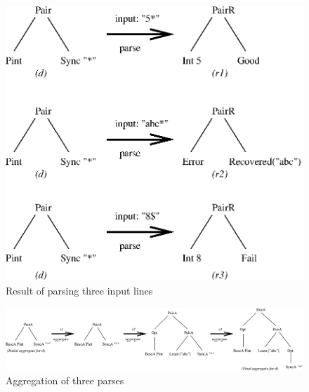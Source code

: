 \begin{figure}[t]
\begin{center}
\includegraphics[width=0.8\columnwidth]{parse}
\caption{Result of parsing three input lines}\label{fig:parse}
\end{center}
\end{figure}

\begin{figure}[t]
\begin{center}
\includegraphics[width=2\columnwidth]{aggregate}
\caption{Aggregation of three parses}\label{fig:aggregate}
\end{center}
\end{figure}


%


